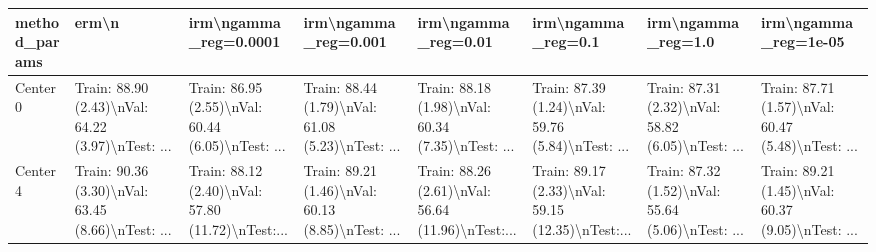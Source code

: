 \begin{tabular}{llllllll}
\toprule
method\_params &                                              erm\textbackslash n &                              irm\textbackslash ngamma\_reg=0.0001 &                               irm\textbackslash ngamma\_reg=0.001 &                                irm\textbackslash ngamma\_reg=0.01 &                                 irm\textbackslash ngamma\_reg=0.1 &                                 irm\textbackslash ngamma\_reg=1.0 &                               irm\textbackslash ngamma\_reg=1e-05 \\
\midrule
Center 0 &  Train: 88.90 (2.43)\textbackslash nVal: 64.22 (3.97)\textbackslash nTest: ... &  Train: 86.95 (2.55)\textbackslash nVal: 60.44 (6.05)\textbackslash nTest: ... &  Train: 88.44 (1.79)\textbackslash nVal: 61.08 (5.23)\textbackslash nTest: ... &  Train: 88.18 (1.98)\textbackslash nVal: 60.34 (7.35)\textbackslash nTest: ... &  Train: 87.39 (1.24)\textbackslash nVal: 59.76 (5.84)\textbackslash nTest: ... &  Train: 87.31 (2.32)\textbackslash nVal: 58.82 (6.05)\textbackslash nTest: ... &  Train: 87.71 (1.57)\textbackslash nVal: 60.47 (5.48)\textbackslash nTest: ... \\
Center 4 &  Train: 90.36 (3.30)\textbackslash nVal: 63.45 (8.66)\textbackslash nTest: ... &  Train: 88.12 (2.40)\textbackslash nVal: 57.80 (11.72)\textbackslash nTest:... &  Train: 89.21 (1.46)\textbackslash nVal: 60.13 (8.85)\textbackslash nTest: ... &  Train: 88.26 (2.61)\textbackslash nVal: 56.64 (11.96)\textbackslash nTest:... &  Train: 89.17 (2.33)\textbackslash nVal: 59.15 (12.35)\textbackslash nTest:... &  Train: 87.32 (1.52)\textbackslash nVal: 55.64 (5.06)\textbackslash nTest: ... &  Train: 89.21 (1.45)\textbackslash nVal: 60.37 (9.05)\textbackslash nTest: ... \\
\bottomrule
\end{tabular}
